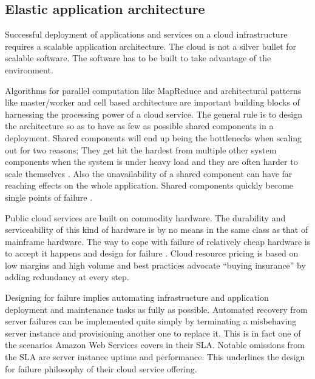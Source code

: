 \documentclass[english]{tktltiki2}
\theoremstyle{definition}
\theoremstyle{remark}
\begin{document}
\subsection{Elastic application architecture}

Successful deployment of applications and services on a cloud infrastructure
requires a scalable application architecture. The cloud is not a silver bullet
for scalable software. The software has to be built to take advantage of the
environment.

Algorithms for parallel computation like MapReduce and architectural patterns
like master/worker and cell based architecture are important building blocks of
harnessing the processing power of a cloud service. The general rule is to
design the architecture so as to have as few as possible shared components in a
deployment. Shared components will end up being the bottlenecks when scaling out
for two reasons; They get hit the hardest from multiple other system components
when the system is under heavy load and they are often harder to scale
themselves . Also the unavailability
of a shared component can have far reaching effects on the whole application.
Shared components quickly become single points of failure .

Public cloud services are built on commodity hardware. The durability and
serviceability of this kind of hardware is by no means in the same class as that
of mainframe hardware. The way to cope with failure of relatively cheap hardware
is to accept it happens and design for failure  . Cloud resource pricing is
based on low margins and high volume  and best practices advocate
``buying insurance'' by adding redundancy at every step.

Designing for failure implies automating infrastructure and application
deployment and maintenance tasks as fully as possible. Automated recovery from
server failures can be implemented quite simply by terminating a misbehaving
server instance and provisioning another one to replace it. This is in fact one
of the scenarios Amazon Web Services covers in their SLA. Notable omissions from the SLA are server instance uptime and performance.
This underlines the design for failure philosophy of their cloud service
offering.

\end{document}
